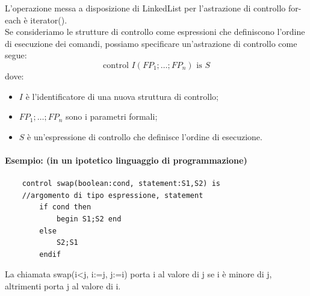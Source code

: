 \documentclass{article}
\begin{document}
	L'operazione messa a disposizione di LinkedList per l'astrazione di controllo for-each è iterator().
	\vspace{\baselineskip} \\
	Se consideriamo le strutture di controllo come espressioni che definiscono l'ordine di esecuzione dei comandi, possiamo specificare un'astrazione di controllo come segue:
	\[
	\text{{control }} I(FP_1; \ldots; FP_n) \text{{ is }} S
	\]
	dove:
	\begin{itemize}
		\item \(I\) è l'identificatore di una nuova struttura di controllo;
		\item \(FP_1; \ldots; FP_n\) sono i parametri formali;
		\item \(S\) è un'espressione di controllo che definisce l'ordine di esecuzione.
	\end{itemize} 
	\paragraph*{Esempio: (in un ipotetico linguaggio di programmazione)}
	\begin{verbatim}
	control swap(boolean:cond, statement:S1,S2) is 
	//argomento di tipo espressione, statement
		if cond then
			begin S1;S2 end
		else
			S2;S1
		endif
	\end{verbatim}
	La chiamata swap(i<j, {i:=j}, {j:=i}) porta i al valore di j se i è minore di j, altrimenti porta j al valore di i.
\end{document}
